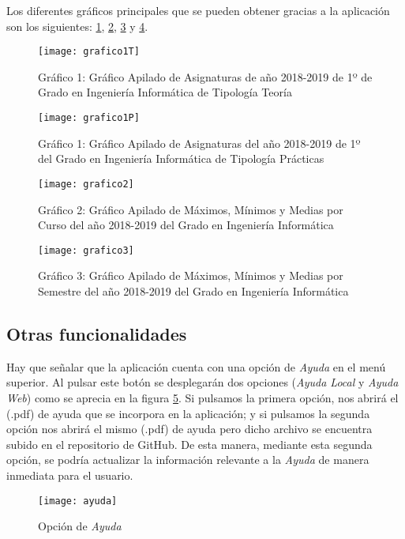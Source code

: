 Los diferentes gráficos principales que se pueden obtener gracias a la aplicación son los siguientes: \ref{fig:grafico1T}, \ref{fig:grafico1P}, \ref{fig:grafico2} y \ref{fig:grafico3}.


\begin{figure}%
		\centering
		\texttt{[image: grafico1T]}
		\caption{Gráfico 1: Gráfico Apilado de Asignaturas de año 2018-2019 de 1º de Grado en Ingeniería Informática de Tipología Teoría}\label{fig:grafico1T}
	\end{figure}


\begin{figure}%
		\centering
		\texttt{[image: grafico1P]}
		\caption{Gráfico 1: Gráfico Apilado de Asignaturas del año 2018-2019 de 1º del Grado en Ingeniería Informática de Tipología Prácticas}\label{fig:grafico1P}
	\end{figure}

\begin{figure}%
		\centering
		\texttt{[image: grafico2]}
		\caption{Gráfico 2: Gráfico Apilado de Máximos, Mínimos y Medias por Curso del año 2018-2019 del Grado en Ingeniería Informática}\label{fig:grafico2}
	\end{figure}

\begin{figure}%
		\centering
		\texttt{[image: grafico3]}
		\caption{Gráfico 3: Gráfico Apilado de Máximos, Mínimos y Medias por Semestre del año 2018-2019 del Grado en Ingeniería Informática}\label{fig:grafico3}
	\end{figure}


\subsection{Otras funcionalidades}

Hay que señalar que la aplicación cuenta con una opción de \emph{Ayuda} en el menú superior. Al pulsar este botón se desplegarán dos opciones (\emph{Ayuda Local} y \emph{Ayuda Web}) como se aprecia en la figura \ref{fig:ayuda}. Si pulsamos la primera opción, nos abrirá el (.pdf) de ayuda que se incorpora en la aplicación; y si pulsamos la segunda opción nos abrirá el mismo (.pdf) de ayuda pero dicho archivo se encuentra subido en el repositorio de GitHub. De esta manera, mediante esta segunda opción, se podría actualizar la información relevante a la \emph{Ayuda} de manera inmediata para el usuario.

\begin{figure}%
		\centering
		\texttt{[image: ayuda]}
		\caption{Opción de \emph{Ayuda}}\label{fig:ayuda}
	\end{figure}


